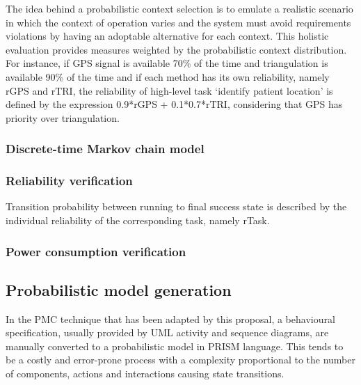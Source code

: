 The idea behind a probabilistic context selection is to emulate a realistic scenario in which the context of operation varies and the system must avoid requirements violations by  having an adoptable alternative for each context. This holistic evaluation provides measures weighted by the probabilistic context distribution. For instance, if GPS signal is available 70\% of the time and triangulation is available 90\% of the time and if each method has its own reliability, namely rGPS and rTRI, the reliability of high-level task `identify patient location' is defined by the expression 0.9*rGPS + 0.1*0.7*rTRI, considering that GPS has priority over triangulation. 


\subsubsection{Discrete-time Markov chain model}



\subsubsection{Reliability verification}

Transition probability between running to final success state is described by the individual reliability of the corresponding task, namely rTask. 

\subsubsection{Power consumption verification}



\subsection{Probabilistic model generation}

In the PMC technique that has been adapted by this proposal, a behavioural specification, usually provided by UML activity and sequence diagrams, are manually converted to a probabilistic model in PRISM language. This tends to be a costly and error-prone process with a complexity proportional to the number of components, actions and interactions causing state transitions.  

